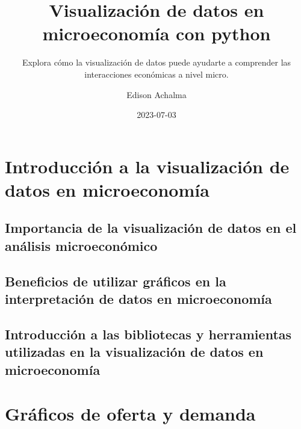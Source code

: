 \documentclass[
  a4paper,
]{article}
\title{Visualización de datos en microeconomía con python}
\subtitle{Explora cómo la visualización de datos puede ayudarte a
comprender las interacciones económicas a nivel micro.}
\author{Edison Achalma}
\date{2023-07-03}
\begin{document}
\maketitle
\ifdefined\Shaded\renewenvironment{Shaded}{\begin{tcolorbox}[interior hidden, breakable, enhanced, borderline west={3pt}{0pt}{shadecolor}, frame hidden, boxrule=0pt, sharp corners]}{\end{tcolorbox}}\fi

\hypertarget{introducciuxf3n-a-la-visualizaciuxf3n-de-datos-en-microeconomuxeda}{%
\section{Introducción a la visualización de datos en
microeconomía}\label{introducciuxf3n-a-la-visualizaciuxf3n-de-datos-en-microeconomuxeda}}

\hypertarget{importancia-de-la-visualizaciuxf3n-de-datos-en-el-anuxe1lisis-microeconuxf3mico}{%
\subsection{Importancia de la visualización de datos en el análisis
microeconómico}\label{importancia-de-la-visualizaciuxf3n-de-datos-en-el-anuxe1lisis-microeconuxf3mico}}

\hypertarget{beneficios-de-utilizar-gruxe1ficos-en-la-interpretaciuxf3n-de-datos-en-microeconomuxeda}{%
\subsection{Beneficios de utilizar gráficos en la interpretación de
datos en
microeconomía}\label{beneficios-de-utilizar-gruxe1ficos-en-la-interpretaciuxf3n-de-datos-en-microeconomuxeda}}

\hypertarget{introducciuxf3n-a-las-bibliotecas-y-herramientas-utilizadas-en-la-visualizaciuxf3n-de-datos-en-microeconomuxeda}{%
\subsection{Introducción a las bibliotecas y herramientas utilizadas en
la visualización de datos en
microeconomía}\label{introducciuxf3n-a-las-bibliotecas-y-herramientas-utilizadas-en-la-visualizaciuxf3n-de-datos-en-microeconomuxeda}}

\hypertarget{gruxe1ficos-de-oferta-y-demanda}{%
\section{Gráficos de oferta y
demanda}\label{gruxe1ficos-de-oferta-y-demanda}}
\end{document}

